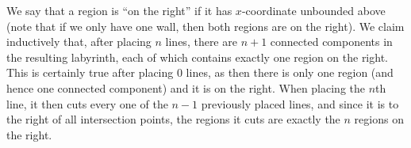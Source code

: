 \begin{center}
\end{center}

We say that a region is ``on the right'' if it has \( x \)-coordinate unbounded above (note that if we only have one wall, then both regions are on the right). We claim inductively that, after placing \( n \) lines, there are \( n + 1 \) connected components in the resulting labyrinth, each of which contains exactly one region on the right. This is certainly true after placing \( 0 \) lines, as then there is only one region (and hence one connected component) and it is on the right. When placing the \( n \)th line, it then cuts every one of the \( n - 1 \) previously placed lines, and since it is to the right of all intersection points, the regions it cuts are exactly the \( n \) regions on the right.

\begin{center}
\end{center}

